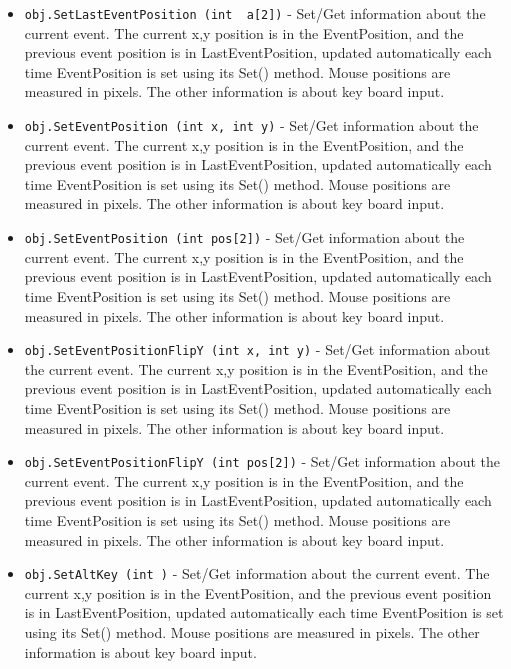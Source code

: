 \begin{itemize}
\item  \verb|obj.SetLastEventPosition (int  a[2])| -  Set/Get information about the current event. 
 The current x,y position is in the EventPosition, and the previous
 event position is in LastEventPosition, updated automatically each
 time EventPosition is set using its Set() method. Mouse positions
 are measured in pixels.
 The other information is about key board input.

\item  \verb|obj.SetEventPosition (int x, int y)| -  Set/Get information about the current event. 
 The current x,y position is in the EventPosition, and the previous
 event position is in LastEventPosition, updated automatically each
 time EventPosition is set using its Set() method. Mouse positions
 are measured in pixels.
 The other information is about key board input.

\item  \verb|obj.SetEventPosition (int pos[2])| -  Set/Get information about the current event. 
 The current x,y position is in the EventPosition, and the previous
 event position is in LastEventPosition, updated automatically each
 time EventPosition is set using its Set() method. Mouse positions
 are measured in pixels.
 The other information is about key board input.

\item  \verb|obj.SetEventPositionFlipY (int x, int y)| -  Set/Get information about the current event. 
 The current x,y position is in the EventPosition, and the previous
 event position is in LastEventPosition, updated automatically each
 time EventPosition is set using its Set() method. Mouse positions
 are measured in pixels.
 The other information is about key board input.

\item  \verb|obj.SetEventPositionFlipY (int pos[2])| -  Set/Get information about the current event. 
 The current x,y position is in the EventPosition, and the previous
 event position is in LastEventPosition, updated automatically each
 time EventPosition is set using its Set() method. Mouse positions
 are measured in pixels.
 The other information is about key board input.

\item  \verb|obj.SetAltKey (int )| -  Set/Get information about the current event. 
 The current x,y position is in the EventPosition, and the previous
 event position is in LastEventPosition, updated automatically each
 time EventPosition is set using its Set() method. Mouse positions
 are measured in pixels.
 The other information is about key board input.


\end{itemize}

